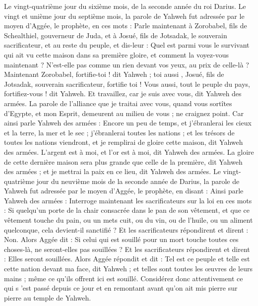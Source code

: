 \begin{multicols}{2}
Le vingt-quatrième jour du sixième mois, de la seconde année du roi Darius.
\VerseOne{}Le vingt et unième jour du septième mois, la parole de Yahweh fut adressée par le moyen d'Aggée, le prophète, en ces mots :
Parle maintenant à Zorobabel, fils de Schealthiel, gouverneur de Juda, et à Josué, fils de Jotsadak, le souverain sacrificateur, et au reste du peuple, et dis-leur :
Quel est parmi vous le survivant qui ait vu cette maison dans sa première gloire, et comment la voyez-vous maintenant ? N'est-elle pas comme un rien devant vos yeux, au prix de celle-là ?
Maintenant Zorobabel, fortifie-toi ! dit Yahweh ;  toi aussi , Josué, fils de Jotsadak, souverain sacrificateur, fortifie toi ! Vous aussi, tout le peuple du pays, fortifiez-vous ! dit Yahweh. Et travaillez, car je suis avec vous, dit Yahweh des armées.
La parole de l'alliance que je traitai avec vous, quand vous sortîtes d'Egypte, et mon Esprit, demeurent au milieu de vous ; ne craignez point.
Car ainsi parle Yahweh des armées : Encore un peu de temps, et j'ébranlerai les cieux et la terre, la mer et le sec ;
j'ébranlerai toutes les nations ; et les trésors de toutes les nations viendront, et je remplirai de gloire cette maison, dit Yahweh des armées.
L'argent est à moi, et l'or est à moi, dit Yahweh des armées.
La gloire de cette dernière maison sera plus grande que celle de la première, dit Yahweh des armées ; et je mettrai la paix en ce lieu, dit Yahweh des armées.
Le vingt-quatrième jour du neuvième mois de la seconde année de Darius, la parole de Yahweh fut adressée par le moyen d'Aggée, le prophète, en disant :
Ainsi parle Yahweh des armées : Interroge maintenant les sacrificateurs sur la loi en ces mots :
Si quelqu'un porte de la chair consacrée dans le pan de son vêtement, et que ce vêtement touche du pain, ou un mets cuit, ou du vin, ou de l'huile, ou un aliment quelconque, cela devient-il sanctifié ? Et les sacrificateurs répondirent et dirent : Non.
Alors Aggée dit : Si celui qui est souillé pour un mort touche toutes ces choses-là, ne seront-elles pas souillées ? Et les sacrificateurs répondirent et dirent : Elles seront souillées.
Alors Aggée répondit et dit : Tel est ce peuple et telle est cette nation devant ma face, dit Yahweh ; et telles sont toutes les œuvres de leurs mains ; même ce qu'ils offrent ici est souillé.
Considérez donc attentivement ce qui s 'est passé depuis ce jour et en remontant avant qu'on ait mis pierre sur pierre au temple de Yahweh.

\end{multicols}
